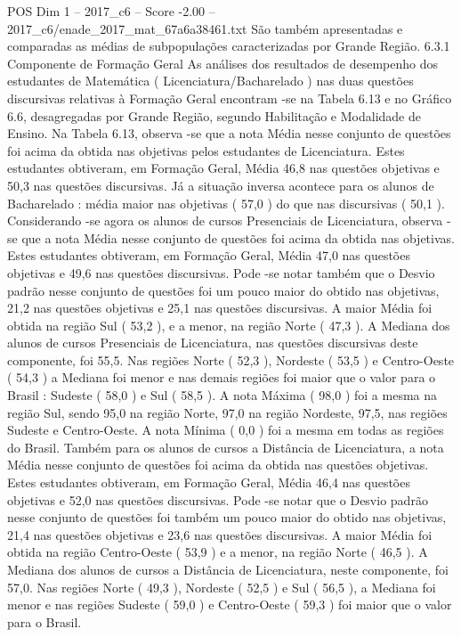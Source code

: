 \begin{textsample}{POS Dim 1 – 2017\_c6 – Score -2.00 – 2017\_c6/enade\_2017\_mat\_67a6a38461.txt}
São também apresentadas e comparadas as médias de subpopulações caracterizadas por Grande Região. 6.3.1 Componente de Formação Geral As análises dos resultados de desempenho dos estudantes de Matemática ( Licenciatura/Bacharelado ) nas duas questões discursivas relativas à Formação Geral encontram -se na Tabela 6.13 e no Gráfico 6.6, desagregadas por Grande Região, segundo Habilitação e Modalidade de Ensino.
Na Tabela 6.13, observa -se que a nota Média nesse conjunto de questões foi acima da obtida nas objetivas pelos estudantes de Licenciatura.
Estes estudantes obtiveram, em Formação Geral, Média 46,8 nas questões objetivas e 50,3 nas questões discursivas.
Já a situação inversa acontece para os alunos de Bacharelado : média maior nas objetivas ( 57,0 ) do que nas discursivas ( 50,1 ).
Considerando -se agora os alunos de cursos Presenciais de Licenciatura, observa -se que a nota Média nesse conjunto de questões foi acima da obtida nas objetivas.
Estes estudantes obtiveram, em Formação Geral, Média 47,0 nas questões objetivas e 49,6 nas questões discursivas.
Pode -se notar também que o Desvio padrão nesse conjunto de questões foi um pouco maior do obtido nas objetivas, 21,2 nas questões objetivas e 25,1 nas questões discursivas.
A maior Média foi obtida na região Sul ( 53,2 ), e a menor, na região Norte ( 47,3 ).
A Mediana dos alunos de cursos Presenciais de Licenciatura, nas questões discursivas deste componente, foi 55,5.
Nas regiões Norte ( 52,3 ), Nordeste ( 53,5 ) e Centro-Oeste ( 54,3 ) a Mediana foi menor e nas demais regiões foi maior que o valor para o Brasil : Sudeste ( 58,0 ) e Sul ( 58,5 ).
A nota Máxima ( 98,0 ) foi a mesma na região Sul, sendo 95,0 na região Norte, 97,0 na região Nordeste, 97,5, nas regiões Sudeste e Centro-Oeste.
A nota Mínima ( 0,0 ) foi a mesma em todas as regiões do Brasil.
Também para os alunos de cursos a Distância de Licenciatura, a nota Média nesse conjunto de questões foi acima da obtida nas questões objetivas.
Estes estudantes obtiveram, em Formação Geral, Média 46,4 nas questões objetivas e 52,0 nas questões discursivas.
Pode -se notar que o Desvio padrão nesse conjunto de questões foi também um pouco maior do obtido nas objetivas, 21,4 nas questões objetivas e 23,6 nas questões discursivas.
A maior Média foi obtida na região Centro-Oeste ( 53,9 ) e a menor, na região Norte ( 46,5 ).
A Mediana dos alunos de cursos a Distância de Licenciatura, neste componente, foi 57,0.
Nas regiões Norte ( 49,3 ), Nordeste ( 52,5 ) e Sul ( 56,5 ), a Mediana foi menor e nas regiões Sudeste ( 59,0 ) e Centro-Oeste ( 59,3 ) foi maior que o valor para o Brasil.

\end{textsample}
